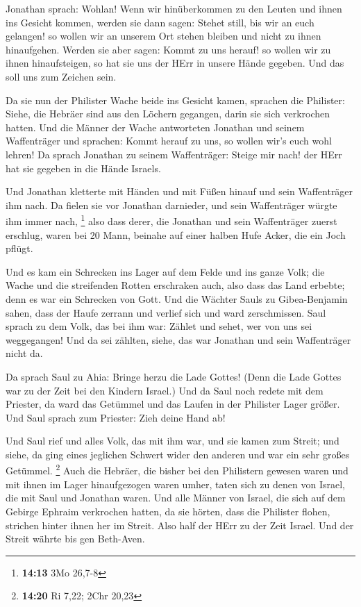  Jonathan sprach: Wohlan! Wenn wir hinüberkommen zu den
Leuten und ihnen ins Gesicht kommen,  werden sie dann sagen:
Stehet still, bis wir an euch gelangen! so wollen wir an unserem Ort
stehen bleiben und nicht zu ihnen hinaufgehen.  Werden sie
aber sagen: Kommt zu uns herauf! so wollen wir zu ihnen hinaufsteigen,
so hat sie uns der HErr in unsere Hände gegeben. Und das soll uns zum
Zeichen sein.

 Da sie nun der Philister Wache beide ins Gesicht kamen,
sprachen die Philister: Siehe, die Hebräer sind aus den Löchern
gegangen, darin sie sich verkrochen hatten.  Und die Männer
der Wache antworteten Jonathan und seinem Waffenträger und sprachen:
Kommt herauf zu uns, so wollen wir's euch wohl lehren! Da sprach
Jonathan zu seinem Waffenträger: Steige mir nach! der HErr hat sie
gegeben in die Hände Israels.

 Und Jonathan kletterte mit Händen und mit Füßen hinauf und
sein Waffenträger ihm nach. Da fielen sie vor Jonathan darnieder, und
sein Waffenträger würgte ihm immer nach, \footnote{\textbf{14:13} 3Mo
  26,7-8}  also dass derer, die Jonathan und sein
Waffenträger zuerst erschlug, waren bei 20 Mann, beinahe auf einer
halben Hufe Acker, die ein Joch pflügt.

 Und es kam ein Schrecken ins Lager auf dem Felde und ins
ganze Volk; die Wache und die streifenden Rotten erschraken auch, also
dass das Land erbebte; denn es war ein Schrecken von Gott. 
Und die Wächter Sauls zu Gibea-Benjamin sahen, dass der Haufe zerrann
und verlief sich und ward zerschmissen.  Saul sprach zu dem
Volk, das bei ihm war: Zählet und sehet, wer von uns sei weggegangen!
Und da sei zählten, siehe, das war Jonathan und sein Waffenträger nicht
da.

 Da sprach Saul zu Ahia: Bringe herzu die Lade Gottes!
(Denn die Lade Gottes war zu der Zeit bei den Kindern Israel.)
 Und da Saul noch redete mit dem Priester, da ward das
Getümmel und das Laufen in der Philister Lager größer. Und Saul sprach
zum Priester: Zieh deine Hand ab!

 Und Saul rief und alles Volk, das mit ihm war, und sie
kamen zum Streit; und siehe, da ging eines jeglichen Schwert wider den
anderen und war ein sehr großes Getümmel. \footnote{\textbf{14:20} Ri
  7,22; 2Chr 20,23}  Auch die Hebräer, die bisher bei den
Philistern gewesen waren und mit ihnen im Lager hinaufgezogen waren
umher, taten sich zu denen von Israel, die mit Saul und Jonathan waren.
 Und alle Männer von Israel, die sich auf dem Gebirge
Ephraim verkrochen hatten, da sie hörten, dass die Philister flohen,
strichen hinter ihnen her im Streit.  Also half der HErr zu
der Zeit Israel. Und der Streit währte bis gen Beth-Aven.

